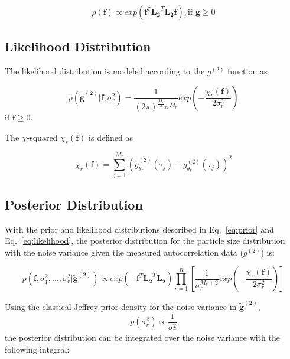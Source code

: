 \documentclass[11pt]{article}
\begin{document}
\begin{equation}\label{eq:prior}
p(\mathbf{f}) \propto exp\left( \mathbf{f}^{T} \mathbf{L_2}^{T}\mathbf{L_2}\mathbf{f} \right), \textrm{if } \mathbf{g} \geq 0
\end{equation}

\subsection{Likelihood Distribution}
The likelihood distribution is modeled according to the $g^{(2)}$ function as 

\begin{equation} \label{eq:likelihood}
p(\mathbf{\tilde{g}^{(2)}} | \mathbf{f}, \sigma^{2}_r ) = \frac{1}{{(2\pi)}^{\frac{M_r}{2}} \sigma^{M_r}}exp\left( -\frac{\chi_r(\mathbf{f})}{2\sigma^2_r}\right)
\end{equation}
if $\mathbf{f} \geq 0$.

The $\chi$-squared $\chi_r(\mathbf{f})$ is defined as 

\begin{equation}
\chi_r(\mathbf{f}) = \sum_{j=1}^{M_r} {\left( \tilde{g}_{\theta_r}^{(2)} (\tau_j) - g_{\theta_r}^{(2)} (\tau_j) \right)}^2
\end{equation}

\subsection{Posterior Distribution}
With the prior and likelihood distributions described in Eq.~\ref{eq:prior} and Eq.~\ref{eq:likelihood}, the posterior distribution for the particle size distribution with the noise variance given the measured autocorrelation data ($g^{(2)}$) is: 

\begin{equation}\label{eq:posterior}
p(\mathbf{f}, \sigma_1^2,\ldots, \sigma_r^2|\mathbf{\tilde{g}^{(2)}}) \propto exp \left( -\mathbf{f}^T\mathbf{L_2}^T\mathbf{L_2} \right) \prod_{r=1}^{R} \left[ \frac{1}{\sigma_r^{M_r+2}} exp \left( -\frac{\chi_r(\mathbf{f})}{2\sigma_r^2} \right) \right]
\end{equation}

Using the classical Jeffrey prior density for the noise variance in $\mathbf{\tilde{g}^{(2)}}$,
\begin{equation}\label{eq:noisevariance}
p(\sigma_r^2) \propto \frac{1}{\sigma_r^2}
\end{equation}
the posterior distribution can be integrated over the noise variance with the following integral:
\end{document}
